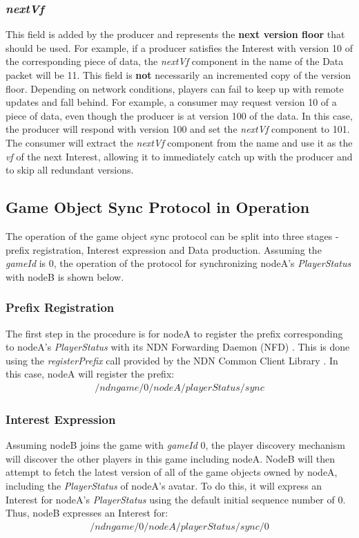 \subsubsection{\textit{nextVf}}
This field is added by the producer and represents the \textbf{next version floor} that should be used. For example, if a producer satisfies the Interest with version 10 of the corresponding piece of data, the \textit{nextVf} component in the name of the Data packet will be 11. This field is \textbf{not} necessarily an incremented copy of the version floor. Depending on network conditions, players can fail to keep up with remote updates and fall behind. For example, a consumer may request version 10 of a piece of data, even though the producer is at version 100 of the data. In this case, the producer will respond with version 100 and set the \textit{nextVf} component to 101. The consumer will extract the \textit{nextVf} component from the name and use it as the \textit{vf} of the next Interest, allowing it to immediately catch up with the producer and to skip all redundant versions.

\subsection{Game Object Sync Protocol in Operation}
The operation of the game object sync protocol can be split into three stages - prefix registration, Interest expression and Data production. Assuming the \textit{gameId} is 0, the operation of the protocol for synchronizing nodeA's \textit{PlayerStatus} with nodeB is shown below.

\subsubsection{Prefix Registration}
The first step in the procedure is for nodeA to register the prefix corresponding to nodeA's \textit{PlayerStatus} with its NDN Forwarding Daemon (NFD) \cite{nfd-dev-guide}. This is done using the \textit{registerPrefix} call provided by the NDN Common Client Library \cite{ndn-ccl}. In this case, nodeA will register the prefix: 
\begin{align*}
    /ndngame/0/nodeA/playerStatus/sync
\end{align*}



\subsubsection{Interest Expression}
Assuming nodeB joins the game with \textit{gameId} 0, the player discovery mechanism will discover the other players in this game including nodeA. NodeB will then attempt to fetch the latest version of all of the game objects owned by nodeA, including the \textit{PlayerStatus} of nodeA's avatar. To do this, it will express an Interest for nodeA's \textit{PlayerStatus} using the default initial sequence number of 0. Thus, nodeB expresses an Interest for: 
\begin{align*}
    /ndngame/0/nodeA/playerStatus/sync/0
\end{align*}

